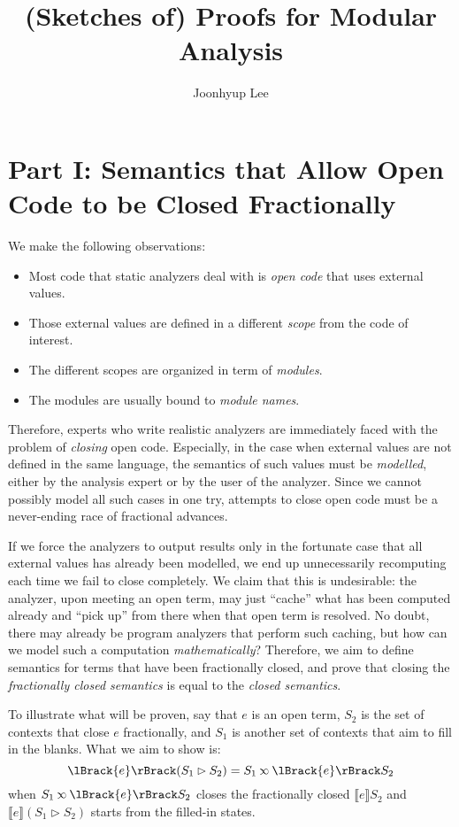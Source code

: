 \documentclass{article}
\title{(Sketches of) Proofs for Modular Analysis}
\author{Joonhyup Lee}
\theoremstyle{definition}
\newcommand*{\semlink}{\mathbin{\rotatebox[origin=c]{180}{$\propto$}}}
\newcommand*{\sembracket}[1]{\lBrack{#1}\rBrack}
\begin{document}
\maketitle

\section{Part I: Semantics that Allow Open Code to be Closed Fractionally}

We make the following observations:
\begin{itemize}
  \item Most code that static analyzers deal with is \emph{open code} that uses external values.
  \item Those external values are defined in a different \emph{scope} from the code of interest.
  \item The different scopes are organized in term of \emph{modules}.
  \item The modules are usually bound to \emph{module names}.
\end{itemize}
Therefore, experts who write realistic analyzers are immediately faced with the problem of \emph{closing} open code.
Especially, in the case when external values are not defined in the same language, the semantics of such values must be \emph{modelled}, either by the analysis expert or by the user of the analyzer.
Since we cannot possibly model all such cases in one try, attempts to close open code must be a never-ending race of fractional advances.

If we force the analyzers to output results only in the fortunate case that all external values has already been modelled, we end up unnecessarily recomputing each time we fail to close completely.
We claim that this is undesirable: the analyzer, upon meeting an open term, may just ``cache'' what has been computed already and ``pick up'' from there when that open term is resolved.
No doubt, there may already be program analyzers that perform such caching, but how can we model such a computation \emph{mathematically}?
Therefore, we aim to define semantics for terms that have been fractionally closed, and prove that closing the \emph{fractionally closed semantics} is equal to the \emph{closed semantics}.

To illustrate what will be proven, say that $e$ is an open term, $S_2$ is the set of contexts that close $e$ fractionally, and $S_1$ is another set of contexts that aim to fill in the blanks.
What we aim to show is:
\[\sembracket{e}(S_1\rhd S_2)=S_1\semlink\sembracket{e}S_2\]
when $S_1\semlink\sembracket{e}S_2$ closes the fractionally closed $\sembracket{e}S_2$ and $\sembracket{e}(S_1\rhd S_2)$ starts from the filled-in states.
\end{document}
